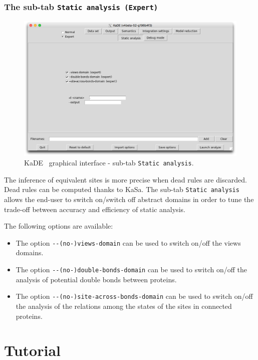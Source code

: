 \documentclass[11pt]{book}
\def\KaSa{\textsf{KaSa}}
\def\KaDE{\textsf{KaDE}}
\begin{document}
\subsubsection{The sub-tab \texttt{Static analysis (Expert)}}

\begin{figure}[htbp]
\centering
\includegraphics[width=12cm,bb=0 0 1904 1208]{img/kade_5.png}
\caption{\KaDE~ graphical interface - sub-tab \texttt{Static analysis}.}
\label{fig:kade:5}
\end{figure}

The inference of equivalent sites is more precise when dead rules are discarded. Dead rules can be computed thanks to {\KaSa}. The sub-tab \texttt{Static analysis} allows the end-user to switch on/switch off abstract domains in order to tune the trade-off between accuracy and efficiency of  static analysis.

The following options are available:
\begin{itemize}
\item The option \verb?--(no-)views-domain? can be used to switch on/off the views domains.

\item The option \verb?--(no-)double-bonds-domain? can be used to switch on/off the analysis of potential double bonds between proteins.

\item The option \verb?--(no-)site-across-bonds-domain? can be used to switch on/off the analysis of the relations among the states of the sites in connected proteins.
\end{itemize}

\section{Tutorial}
\end{document}
